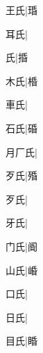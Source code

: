 \begin{multicols}{2}
{{\cjk{}{\cnsym{}　}王氏}\mktsJzrVerticalBar{}{\cjk{}{\cnsym{}　}{\cnsym{}　}{\cnsym{}　}}|{\cjk{}琘}\par
{\cjk{}{\cnsym{}　}耳氏}\mktsJzrVerticalBar{}{\cjk{}{\cnsym{}　}{\cnsym{}　}{\cnsym{}　}}|{}\par
{氏}\mktsJzrVerticalBar{}{\cjk{}{\cnsym{}　}{\cnsym{}　}{\cnsym{}　}}|{\cjk{}捪}\par
{\cjk{}{\cnsym{}　}木氏}\mktsJzrVerticalBar{}{\cjk{}{\cnsym{}　}{\cnsym{}　}{\cnsym{}　}}|{\cjk{}棔}\par
{\cjk{}{\cnsym{}　}車氏}\mktsJzrVerticalBar{}{\cjk{}{\cnsym{}　}{\cnsym{}　}{\cnsym{}　}}|{}\par
{\cjk{}{\cnsym{}　}石氏}\mktsJzrVerticalBar{}{\cjk{}{\cnsym{}　}{\cnsym{}　}{\cnsym{}　}}|{\cjk{}碈}\par
{\cjk{}月厂氏}\mktsJzrVerticalBar{}{\cjk{}{\cnsym{}　}{\cnsym{}　}{\cnsym{}　}}|{}\par
{\cjk{}{\cnsym{}　}歹氏}\mktsJzrVerticalBar{}{\cjk{}{\cnsym{}　}{\cnsym{}　}{\cnsym{}　}}|{\cjk{}殙}\par
{\cjk{}{\cnsym{}　}歹氏}\mktsJzrVerticalBar{}{\cjk{}{\cnsym{}　}{\cnsym{}　}{\cnsym{}　}}|{}\par
{\cjk{}{\cnsym{}　}牙氏}\mktsJzrVerticalBar{}{\cjk{}{\cnsym{}　}{\cnsym{}　}{\cnsym{}　}}|{}\par
{\cjk{}{\cnsym{}　}门氏}\mktsJzrVerticalBar{}{\cjk{}{\cnsym{}　}{\cnsym{}　}{\cnsym{}　}}|{\cjk{}阍}\par
{\cjk{}{\cnsym{}　}山氏}\mktsJzrVerticalBar{}{\cjk{}{\cnsym{}　}{\cnsym{}　}{\cnsym{}　}}|{\cjk{}崏}\par
{\cjk{}{\cnsym{}　}口氏}\mktsJzrVerticalBar{}{\cjk{}{\cnsym{}　}{\cnsym{}　}{\cnsym{}　}}|{}\par
{\cjk{}{\cnsym{}　}日氏}\mktsJzrVerticalBar{}{\cjk{}{\cnsym{}　}{\cnsym{}　}{\cnsym{}　}}|{}\par
{\cjk{}{\cnsym{}　}目氏}\mktsJzrVerticalBar{}{\cjk{}{\cnsym{}　}{\cnsym{}　}{\cnsym{}　}}|{\cjk{}睧}\par
}
\end{multicols}
